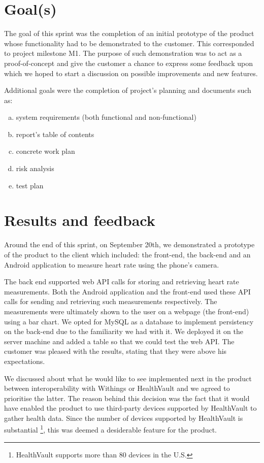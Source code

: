 \section{Goal(s)}

The goal of this sprint was the completion of an initial prototype of the product whose functionality had to be demonstrated to the customer.
This corresponded to project milestone M1.
The purpose of such demonstration was to act as a proof-of-concept and give the customer a chance to express some feedback upon which we hoped to start a discussion on possible improvements and new features.

Additional goals were the completion of project's planning and documents such as:
\begin{enumerate}[a)]
\item system requirements (both functional and non-functional)
\item report's table of contents
\item concrete work plan
\item risk analysis
\item test plan
\end{enumerate}


\section{Results and feedback}

Around the end of this sprint, on September 20th, we demonstrated a prototype of the product to
the client which included: the front-end, the back-end and an Android application to measure heart rate using the phone's camera.

The back end supported web API calls for storing and retrieving heart rate measurements.
Both the Android application and the front-end used these API calls for sending and retrieving such measurements respectively.
The measurements were ultimately shown to the user on a webpage (the front-end) using a bar chart.
We opted for MySQL as a database to implement persistency on the back-end due to the familiarity we had with it. 
We deployed it on the server machine and added a table so that we could test the web API.
The customer was pleased with the results, stating that they were above his expectations.

We discussed about what he would like to see implemented next in the product between interoperability
with Withings or HealthVault and we agreed to prioritise the latter.
The reason behind this decision was the fact that it would have enabled the product to use third-party
devices supported by HealthVault to gather health data.
Since the number of devices supported by HealthVault is substantial \footnote{HealthVault supports more
than 80 devices in the U.S.}, this was deemed a desiderable feature for the product.


